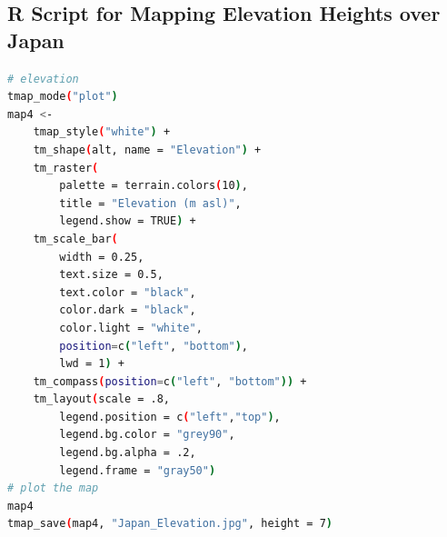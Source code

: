 \documentclass[land,article,accept,pdftex,moreauthors]{Definitions/mdpi}
\begin{document}
\subsection[\appendixname~\thesubsection]{R Script for Mapping Elevation Heights over Japan}
\begin{lstlisting}[language=bash,caption=R script for mapping elevation heights over Japan.]
# elevation
tmap_mode("plot")
map4 <-
    tmap_style("white") +
    tm_shape(alt, name = "Elevation") +
    tm_raster(
        palette = terrain.colors(10),
        title = "Elevation (m asl)",
        legend.show = TRUE) +
    tm_scale_bar(
        width = 0.25,
        text.size = 0.5,
        text.color = "black",
        color.dark = "black",
        color.light = "white",
        position=c("left", "bottom"),
        lwd = 1) +
    tm_compass(position=c("left", "bottom")) +
    tm_layout(scale = .8,
        legend.position = c("left","top"),
        legend.bg.color = "grey90",
        legend.bg.alpha = .2,
        legend.frame = "gray50")
# plot the map
map4
tmap_save(map4, "Japan_Elevation.jpg", height = 7)
\end{lstlisting}
\end{document}

